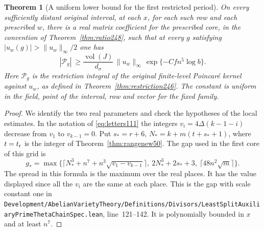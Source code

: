 \documentclass[a4paper,11pt]{article}
\newtheorem{theorem}[proposition]{Theorem}
\theoremstyle{definition}
\theoremstyle{remark}
\newcommand{\srcloc}[2]{{\small\nolinkurl{#1.lean}}, line~#2}
\numberwithin{equation}{section}
\begin{document}
\begin{theorem}[A uniform lower bound for the first restricted period]
\label{thm:first250}
On every sufficiently distant original interval, at each \(x\), for
each such row and each prescribed \(w\), there is a real matrix
coefficient for the prescribed core, in the convention of
Theorem~\ref{thm:ratio248}, such that at every \(g\) satisfying
\(|u_w(g)|>\|u_w\|_\infty/2\) one has
\[
   |\mathcal P_g|\ \ge
    \frac{\operatorname{vol}(J)}{d_\sigma}\,\|u_w\|_\infty\,
           \exp\{-C f n^5\log b\} .
\]
Here \(\mathcal P_g\) is the restriction integral of the original
finite-level Poincar\'e kernel against \(u_w\), as defined in
Theorem~\ref{thm:restriction246}. The constant is uniform in the
field, point of the interval, row and vector for the fixed family.
\end{theorem}
\begin{proof}
We identify the two real parameters and check the hypotheses of the
local estimates. In the notation of \eqref{eq:letters111} the integers
\(v_i=4\Delta(k-1-i)\) decrease from \(v_1\) to \(v_{k-1}=0\).
Put \(s_*=r+6\), \(N_*=k+m(t+s_*+1)\), where \(t=t_{\rm r}\)
is the integer of Theorem~\ref{thm:rangenew50}. The gap used in the
first core of this grid is
\[
 g_*=\max\bigl\{\lceil N_*^3+n^7+n^3\sqrt{v_1-v_{k-1}}\rceil,
             \ 2N_*^3+2s_*+3,\ \lceil48n^2\sqrt m\rceil\bigr\} .
\]
The spread in this formula is the maximum over the real places. It
has the value displayed since all the \(v_i\) are the same at each
place. This is the gap with scale constant one in
\srcloc{Development/AbelianVarietyTheory/Definitions/Divisors/LeastSplitAuxiliaryPrimeThetaChainSpec}{121--142}.
It is polynomially bounded in \(x\) and at least \(n^7\).


\end{proof}
\end{document}
